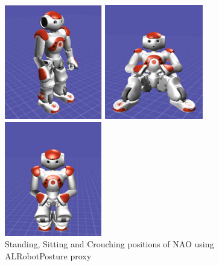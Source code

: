 \begin{figure}
	\centering 
	\begin{minipage}
		{.3 
		\textwidth} \centering 
		\includegraphics[height=5cm]{figures/content/nao-stand.jpg} 
	\end{minipage}
	\begin{minipage}
		{.3 
		\textwidth} \centering 
		\includegraphics[height=5cm]{figures/content/nao-sit.jpg} 
	\end{minipage}
	\begin{minipage}
		{.3 
		\textwidth} \centering 
		\includegraphics[height=5cm]{figures/content/nao-crouch.jpg} 
	\end{minipage}
	\caption{Standing, Sitting and Crouching positions of NAO using ALRobotPosture proxy} \label{fg:nao:motion} 
\end{figure}
